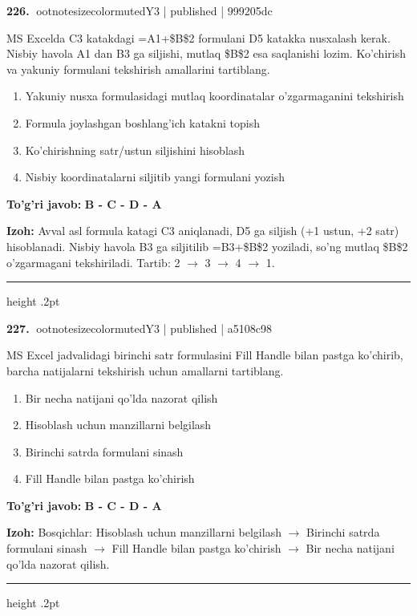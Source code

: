 \documentclass[10pt,a4paper]{article}
\begin{document}
\textbf{\color{ink}226.} {ootnotesizecolor{muted}Y3 | published | 999205dc}
\par
MS Excelda C3 katakdagi =A1+\$B\$2 formulani D5 katakka nusxalash kerak. Nisbiy havola A1 dan B3 ga siljishi, mutlaq \$B\$2 esa saqlanishi lozim. Ko'chirish va yakuniy formulani tekshirish amallarini tartiblang.
\begin{enumerate}[label=\Alph*),leftmargin=9mm]
\item Yakuniy nusxa formulasidagi mutlaq koordinatalar o'zgarmaganini tekshirish
\item Formula joylashgan boshlang'ich katakni topish
\item Ko'chirishning satr/ustun siljishini hisoblash
\item Nisbiy koordinatalarni siljitib yangi formulani yozish
\end{enumerate}
\begin{tcolorbox}[enhanced,breakable,colback=teal!4,colframe=teal!55!black,boxrule=0.45pt,arc=1.2mm,left=2.8mm,right=2.8mm,top=2mm,bottom=2mm]
\textbf{\color{teal}To'g'ri javob:} \textbf{B - C - D - A}
\par\smallskip
\textbf{Izoh:} Avval asl formula katagi C3 aniqlanadi, D5 ga siljish (+1 ustun, +2 satr) hisoblanadi. Nisbiy havola B3 ga siljitilib =B3+\$B\$2 yoziladi, so'ng mutlaq \$B\$2 o'zgarmagani tekshiriladi. Tartib: 2 \ensuremath{\rightarrow} 3 \ensuremath{\rightarrow} 4 \ensuremath{\rightarrow} 1.
\end{tcolorbox}
\vspace{2mm}\hrule height .2pt\vspace{2mm}

\textbf{\color{ink}227.} {ootnotesizecolor{muted}Y3 | published | a5108c98}
\par
MS Excel jadvalidagi birinchi satr formulasini Fill Handle bilan pastga ko'chirib, barcha natijalarni tekshirish uchun amallarni tartiblang.
\begin{enumerate}[label=\Alph*),leftmargin=9mm]
\item Bir necha natijani qo'lda nazorat qilish
\item Hisoblash uchun manzillarni belgilash
\item Birinchi satrda formulani sinash
\item Fill Handle bilan pastga ko'chirish
\end{enumerate}
\begin{tcolorbox}[enhanced,breakable,colback=teal!4,colframe=teal!55!black,boxrule=0.45pt,arc=1.2mm,left=2.8mm,right=2.8mm,top=2mm,bottom=2mm]
\textbf{\color{teal}To'g'ri javob:} \textbf{B - C - D - A}
\par\smallskip
\textbf{Izoh:} Bosqichlar: Hisoblash uchun manzillarni belgilash \ensuremath{\rightarrow} Birinchi satrda formulani sinash \ensuremath{\rightarrow} Fill Handle bilan pastga ko'chirish \ensuremath{\rightarrow} Bir necha natijani qo'lda nazorat qilish.
\end{tcolorbox}
\vspace{2mm}\hrule height .2pt\vspace{2mm}
\end{document}
